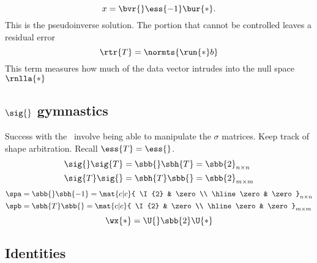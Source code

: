   \begin{equation}
      x = \bvr{}\ess{-1}\bur{*}.
  \end{equation}
This is the pseudoinverse solution. The portion that cannot be controlled leaves a residual error
  \begin{equation}
      \rtr{T} = \normts{\run{*}b}
  \end{equation}
This term measures how much of the data vector intrudes into the null space $\rnlla{*}$


\subsection{$\sig{}$ gymnastics}
Success with the \asvd \ involve being able to manipulate the $\sigma$ matrices. Keep track of shape arbitration. Recall $\ess{T}=\ess{}$.
  \begin{equation}
    \begin{split}
      \sig{}\sig{T} &= \sbb{}\sbh{T} = \sbb{2}_{n\times n} \\
      \sig{T}\sig{} &= \sbh{T}\sbb{} = \sbb{2}_{m\times m} \\
    \end{split}
  \end{equation}
  \begin{equation}
    \begin{split}
      \spa &= \sbb{}\sbh{-1} = { \mat{c|c} { \I{2} & \zero \\ \hline \zero & \zero } }_{n\times n} \\
      \spb &= \sbh{T}\sbb{} = { \mat{c|c} { \I{2} & \zero \\ \hline \zero & \zero } }_{m\times m} \\
    \end{split}
  \end{equation}
  \begin{equation}
      \wx{*} = \U{}\sbb{2}\U{*}
  \end{equation}

\subsection{Identities}


\endinput  %

